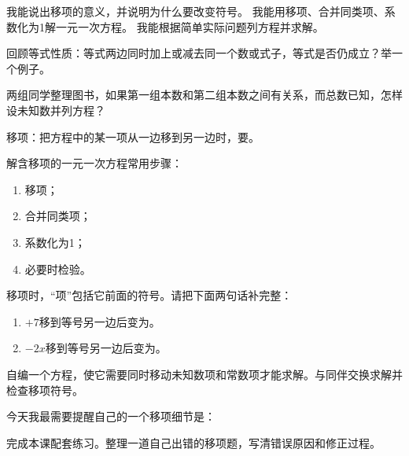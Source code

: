 \documentclass[UTF8,a4paper,11pt]{ctexart}
\begin{document}
\StudentHeader

\ObjectiveList
{我能说出移项的意义，并说明为什么要改变符号。}
{我能用移项、合并同类项、系数化为1解一元一次方程。}
{我能根据简单实际问题列方程并求解。}

回顾等式性质：等式两边同时加上或减去同一个数或式子，等式是否仍成立？举一个例子。

两组同学整理图书，如果第一组本数和第二组本数之间有关系，而总数已知，怎样设未知数并列方程？


移项：把方程中的某一项从一边移到另一边时，要\makebox[0.22\linewidth]{\dotfill}。

解含移项的一元一次方程常用步骤：
\begin{enumerate}
\item 移项；
\item 合并同类项；
\item 系数化为1；
\item 必要时检验。
\end{enumerate}




\studentSpace[6]

移项时，“项”包括它前面的符号。请把下面两句话补完整：
\begin{enumerate}
\item \(+7\)移到等号另一边后变为\makebox[0.16\linewidth]{\dotfill}。
\item \(-2x\)移到等号另一边后变为\makebox[0.16\linewidth]{\dotfill}。
\end{enumerate}

自编一个方程，使它需要同时移动未知数项和常数项才能求解。与同伴交换求解并检查移项符号。

今天我最需要提醒自己的一个移项细节是：


完成本课配套练习。整理一道自己出错的移项题，写清错误原因和修正过程。
\end{document}
